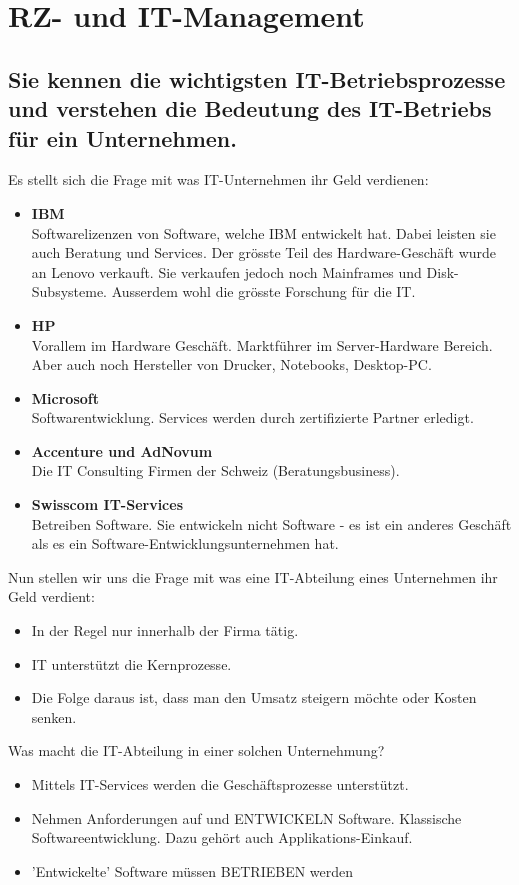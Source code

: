 \chapter{RZ- und IT-Management}

\section{Sie kennen die wichtigsten IT-Betriebsprozesse und
	verstehen die Bedeutung des IT-Betriebs für ein
	Unternehmen.}
\label{zweck-der-it-im-unternehmen}

Es stellt sich die Frage mit was IT-Unternehmen ihr Geld verdienen:
\begin{itemize}
	\item \textbf{IBM}\\
	Softwarelizenzen von Software, welche IBM entwickelt hat. Dabei leisten sie auch Beratung und Services. Der grösste Teil
	des Hardware-Geschäft wurde an Lenovo verkauft. Sie verkaufen jedoch noch Mainframes und Disk-Subsysteme. Ausserdem
	wohl die grösste Forschung für die IT.
	\item \textbf{HP}\\
	Vorallem im Hardware Geschäft. Marktführer im Server-Hardware Bereich. Aber auch noch Hersteller von Drucker, Notebooks,
	Desktop-PC.
	\item \textbf{Microsoft}\\
	Softwarentwicklung. Services werden durch zertifizierte Partner erledigt.
	\item \textbf{Accenture und AdNovum}\\
	Die IT Consulting Firmen der Schweiz (Beratungsbusiness).
	\item \textbf{Swisscom IT-Services}\\
	Betreiben Software. Sie entwickeln nicht Software - es ist ein anderes Geschäft als es ein Software-Entwicklungsunternehmen hat.
\end{itemize}

Nun stellen wir uns die Frage mit was eine IT-Abteilung eines Unternehmen ihr Geld verdient:
\begin{itemize}
	\item In der Regel nur innerhalb der Firma tätig.
	\item IT unterstützt die Kernprozesse.	
	\item Die Folge daraus ist, dass man den Umsatz steigern möchte oder Kosten senken.
\end{itemize}

Was macht die IT-Abteilung in einer solchen Unternehmung?
\begin{itemize}
	\item Mittels IT-Services werden die Geschäftsprozesse unterstützt.
	\item Nehmen Anforderungen auf und ENTWICKELN Software. Klassische Softwareentwicklung. Dazu gehört auch Applikations-Einkauf.
	\item 'Entwickelte' Software müssen BETRIEBEN werden
\end{itemize}

